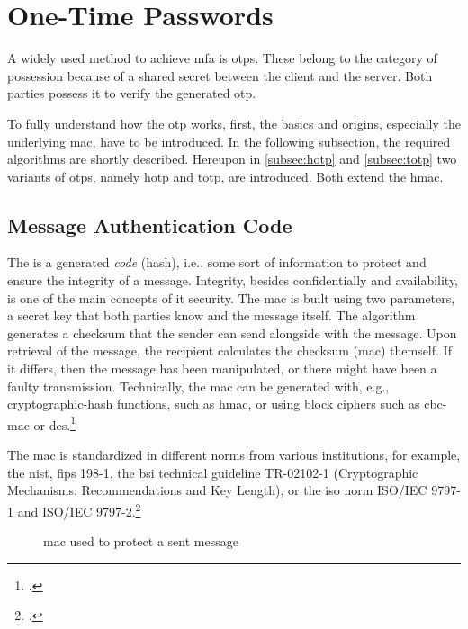 \section{One-Time Passwords}

A widely used method to achieve \gls{mfa} is \glspl{otp}. These belong to the category of possession because of a shared secret between the client and the server. Both parties possess it to verify the generated \gls{otp}.

To fully understand how the \gls{otp} works, first, the basics and origins, especially the underlying \gls{mac}, have to be introduced. In the following subsection, the required algorithms are shortly described. Hereupon in \autoref{subsec:hotp} and \autoref{subsec:totp} two variants of \glspl{otp}, namely \gls{hotp} and \gls{totp}, are introduced. Both extend the \gls{hmac}.

\subsection{Message Authentication Code}

The  is a generated \textit{code} (hash), i.e., some sort of information to protect and ensure the integrity of a message. Integrity, besides confidentially and availability, is one of the main concepts of \gls{it} security. The \gls{mac} is built using two parameters, a secret key that both parties know and the message itself. The algorithm generates a checksum that the sender can send alongside with the message. Upon retrieval of the message, the recipient calculates the checksum (\gls{mac}) themself. If it differs, then the message has been manipulated, or there might have been a faulty transmission. Technically, the \gls{mac} can be generated with, e.g., cryptographic-hash functions, such as \gls{hmac}, or using block ciphers such as \gls{cbc-mac} or \gls{des}.\footcites[See][565]{320284}[See][163--168]{anderson2008security}[See][391--393]{eckert-it-sec-9}

The \gls{mac} is standardized in different norms from various institutions, for example, the \gls{nist}, \gls{fips} 198-1, the \gls{bsi} technical guideline TR-02102-1 (\frqq Cryptographic Mechanisms: Recommendations and Key Length\flqq{}), or the \gls{iso} norm ISO/IEC 9797-1 and ISO/IEC 9797-2.\footcites[See][]{FIPS198}[See][]{bsi2019recommendations}[See][]{iso9797-1}[See][]{iso9797-2}
 
\begin{figure}[hbt]
	\centering
	
	\caption[\Glsdesc{mac} used to protect a sent message]{\Glsdesc{mac} used to protect a sent message\footnotemark}
	\label{fig:mac}
\end{figure}

